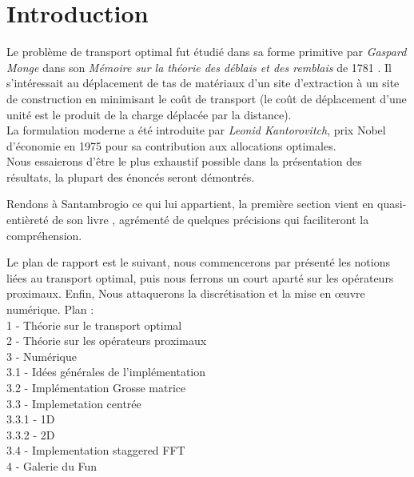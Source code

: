 \documentclass[a4paper,12pt]{article}
\title{\titre }
\author{\auteur}
\date{\dateDoc}
\begin{document}
\thispagestyle{empty}
\maketitle
\tableofcontents
\newpage
\section{Introduction}
Le problème de transport optimal fut étudié dans sa forme primitive par \emph{Gaspard Monge} dans son \emph{Mémoire sur la théorie des déblais et des remblais} de 1781 \cite{monge}. Il s'intéressait au déplacement de tas de matériaux d'un site d'extraction à un site de construction en minimisant le coût de transport (le coût de déplacement d'une unité est le produit de la charge déplacée par la distance). \\
La formulation moderne a été introduite par \emph{Leonid Kantorovitch}, prix Nobel d'économie en 1975 pour sa contribution aux allocations optimales.  \\


Nous essaierons d'être le plus exhaustif possible dans la présentation des résultats, la plupart des énoncés seront démontrés. 


Rendons à Santambrogio ce qui lui appartient, la première section vient en quasi-entièreté de son livre \cite{santambrogio2015optimal}, agrémenté de quelques précisions qui faciliteront la compréhension. 

Le plan de rapport est le suivant, nous commencerons par présenté les notions liées au transport optimal, puis nous ferrons un court aparté sur les opérateurs proximaux. Enfin, Nous attaquerons la discrétisation et la mise en œuvre numérique. 
{\Huge Plan : \\
1 - Théorie sur le transport optimal \\
2 - Théorie sur les opérateurs proximaux  \\
3 - Numérique \\
	3.1 - Idées générales de l'implémentation \\
	3.2 - Implémentation Grosse matrice \\
	3.3 - Implemetation centrée \\
		3.3.1 - 1D \\
		3.3.2 - 2D \\
	3.4 - Implementation staggered FFT \\
4 - Galerie du Fun \\

}
\newpage
\end{document}
